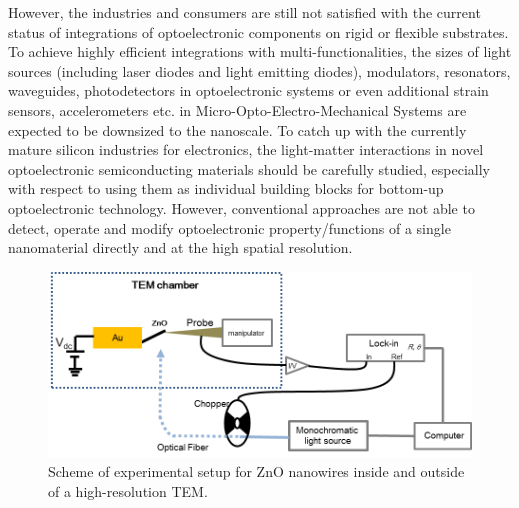 However, the industries and consumers are still not satisfied with the current status of integrations of optoelectronic components on rigid or flexible substrates.\cite{C.2009, T.2004, D.2004}
To achieve highly efficient integrations with multi-functionalities, the sizes of light sources (including laser diodes and light emitting diodes), modulators, resonators, waveguides, photodetectors in optoelectronic systems or even additional strain sensors, accelerometers etc. in Micro-Opto-Electro-Mechanical Systems are expected to be downsized to the nanoscale.\cite{E.2007} 
To catch up with the currently mature silicon industries for electronics, the light-matter interactions in novel optoelectronic semiconducting materials should be carefully studied, especially with respect to using them as individual building blocks for bottom-up optoelectronic technology. 
However, conventional approaches are not able to detect, operate and modify optoelectronic property/functions of a single nanomaterial directly and at the high spatial resolution. 

\begin{figure}  
\includegraphics[width=\textwidth]{figures/figure5_1}
\caption[Experimental setup for Zinc Oxide.]{Scheme of experimental setup for ZnO nanowires inside and outside of a high-resolution TEM.
\label{fig:5_1}}
\end{figure}

